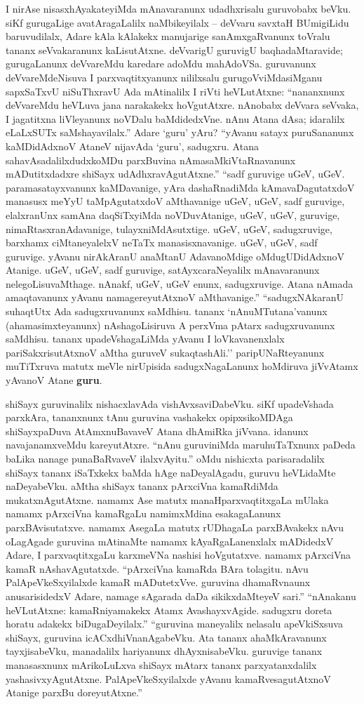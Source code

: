 I nirAse nisasxhAyakateyiMda mAnavaranunx udadhxrisalu guruvobabx beVku. siKf gurugaLige avatAragaLalilx naMbikeyilalx -- deVvaru savxtaH BUmigiLidu baruvudilalx, Adare kAla kAlakekx manujarige sanAmxgaRvanunx toVralu tananx seVvakaranunx kaLisutAtxne. deVvarigU guruvigU baqhadaMtaravide; gurugaLanunx deVvareMdu karedare adoMdu mahAdoVSa. guruvanunx deVvareMdeNisuva I parxvaqtitxyanunx nililxsalu gurugoVviMdasiMganu sapxSaTxvU niSuThxravU Ada mAtinalilx I riVti heVLutAtxne: ``nananxnunx deVvareMdu heVLuva jana narakakekx hoVgutAtxre. nAnobabx deVvara seVvaka, I jagatitxna liVleyanunx noVDalu baMdidedxVne. nAnu Atana dAsa; idaralilx eLaLxSUTx saMshayavilalx.'' Adare `guru' yAru? ``yAvanu satayx puruSananunx kaMDidAdxnoV AtaneV nijavAda `guru', sadugxru. Atana sahavAsadalilxdudxkoMDu parxBuvina nAmasaMkiVtaRnavanunx mADutitxdadxre shiSayx udAdhxravAgutAtxne.'' ``sadf guruvige uGeV, uGeV. paramasatayxvanunx kaMDavanige, yAra dashaRnadiMda kAmavaDagutatxdoV manasusx meYyU taMpAgutatxdoV aMthavanige uGeV, uGeV, sadf guruvige, elalxranUnx samAna daqSiTxyiMda noVDuvAtanige, uGeV, uGeV, guruvige, nimaRtasxranAdavanige, tulayxniMdAsutxtige. uGeV, uGeV, sadugxruvige, barxhamx ciMtaneyalelxV neTaTx manasisxnavanige. uGeV, uGeV, sadf guruvige. yAvanu nirAkAranU anaMtanU AdavanoMdige oMdugUDidAdxnoV Atanige. uGeV, uGeV, sadf guruvige, satAyxcaraNeyalilx mAnavaranunx nelegoLisuvaMthage. nAnakf, uGeV, uGeV enunx, sadugxruvige. Atana nAmada amaqtavanunx yAvanu namagereyutAtxnoV aMthavanige.'' ``sadugxNAkaranU suhaqtUtx Ada sadugxruvanunx saMdhisu. tananx `nAnuMTutana'vanunx (ahamasimxteyanunx) nAshagoLisiruva A perxVma pAtarx sadugxruvanunx saMdhisu. tananx upadeVshagaLiMda yAvanu I loVkavanenxlalx pariSakxrisutAtxnoV aMtha guruveV sukaqtashAli.'' paripUNaRteyanunx muTiTxruva matutx meVle nirUpisida sadugxNagaLanunx hoMdiruva jiVvAtamx yAvanoV Atane {\bf guru}.

shiSayx guruvinalilx nishacxlavAda vishAvxsaviDabeVku. siKf upadeVshada parxkAra, tananxnunx tAnu guruvina vashakekx opipxsikoMDAga shiSayxpaDuva AtAmxnuBavaveV Atana dhAmiRka jiVvana. idanunx navajanamxveMdu kareyutAtxre. ``nAnu guruviniMda maruhuTaTxnunx paDeda baLika nanage punaBaRvaveV ilalxvAyitu.'' oMdu nishicxta parisaradalilx shiSayx tananx iSaTxkekx baMda hAge naDeyalAgadu, guruvu heVLidaMte naDeyabeVku. aMtha shiSayx tananx pArxciVna kamaRdiMda mukatxnAgutAtxne. namamx Ase matutx manaHparxvaqtitxgaLa mUlaka namamx pArxciVna kamaRgaLu namimxMdina esakagaLanunx parxBAvisutatxve. namamx AsegaLa matutx rUDhagaLa parxBAvakekx nAvu oLagAgade guruvina mAtinaMte namamx kAyaRgaLanenxlalx mADidedxV Adare, I parxvaqtitxgaLu karxmeVNa nashisi hoVgutatxve. namamx pArxciVna kamaR nAshavAgutatxde. ``pArxciVna kamaRda BAra tolagitu. nAvu PalApeVkeSxyilalxde kamaR mADutetxVve. guruvina dhamaRvnaunx anusarisidedxV Adare, namage sAgarada daDa sikikxdaMteyeV sari.'' ``nAnakanu heVLutAtxne: kamaRniyamakekx Atamx AvashayxvAgide. sadugxru doreta horatu adakekx biDugaDeyilalx.'' ``guruvina maneyalilx nelasalu apeVkiSxsuva shiSayx, guruvina icACxdhiVnanAgabeVku. Ata tananx ahaMkAravanunx tayxjisabeVku, manadalilx hariyanunx dhAyxnisabeVku. guruvige tananx manasasxnunx mArikoLuLxva shiSayx mAtarx tananx parxyatanxdalilx yashasivxyAgutAtxne. PalApeVkeSxyilalxde yAvanu kamaRvesagutAtxnoV Atanige parxBu doreyutAtxne.''

